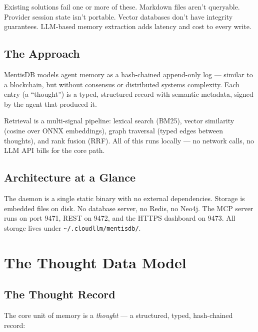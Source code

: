 \documentclass[11pt,a4paper]{article}
\begin{document}
Existing solutions fail one or more of these. Markdown files aren't queryable. Provider
session state isn't portable. Vector databases don't have integrity guarantees. LLM-based
memory extraction adds latency and cost to every write.

\subsection{The Approach}

MentisDB models agent memory as a hash-chained append-only log — similar to a blockchain,
but without consensus or distributed systems complexity. Each entry (a ``thought'') is a
typed, structured record with semantic metadata, signed by the agent that produced it.

Retrieval is a multi-signal pipeline: lexical search (BM25), vector similarity (cosine
over ONNX embeddings), graph traversal (typed edges between thoughts), and rank fusion
(RRF). All of this runs locally — no network calls, no LLM API bills for the core path.

\subsection{Architecture at a Glance}

The daemon is a single static binary with no external dependencies. Storage is embedded
files on disk. No database server, no Redis, no Neo4j. The MCP server runs on port 9471,
REST on 9472, and the HTTPS dashboard on 9473. All storage lives under
\texttt{\textasciitilde/.cloudllm/mentisdb/}.

\section{The Thought Data Model}

\subsection{The Thought Record}

The core unit of memory is a \emph{thought} — a structured, typed, hash-chained record:
\end{document}
